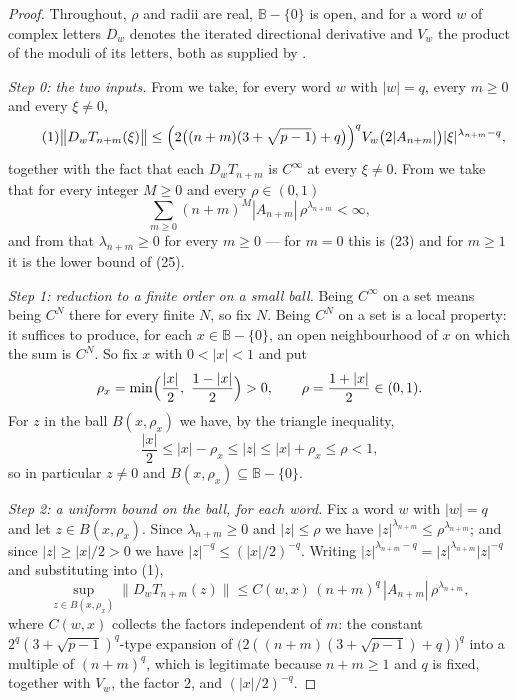 \begin{proof}
Throughout, $\rho$ and radii are real, $\mathbb{B}-\{0\}$ is open, and for a
word $w$ of complex letters $D_w$ denotes the iterated directional derivative
and $V_w$ the product of the moduli of its letters, both as supplied by
.

\emph{Step 0: the two inputs.}  From  we take,
for every word $w$ with $|w|=q$, every $m\ge0$ and every $\xi\ne0$,
\begin{equation}\tag{1}
  \bigl\|D_wT_{n+m}(\xi)\bigr\|
  \le\Bigl(2\bigl((n+m)(3+\sqrt{p-1})+q\bigr)\Bigr)^{q}V_w
     \bigl(2|A_{n+m}|\bigr)|\xi|^{\lambda_{n+m}-q},
\end{equation}
together with the fact that each $D_wT_{n+m}$ is $C^\infty$ at every $\xi\ne0$.
From  we take that for every integer
$M\ge0$ and every $\rho\in(0,1)$
\begin{equation}\tag{2}
  \sum_{m\ge0}(n+m)^{M}|A_{n+m}|\,\rho^{\lambda_{n+m}}<\infty ,
\end{equation}
and from  that $\lambda_{n+m}\ge0$ for every
$m\ge0$ --- for $m=0$ this is (23) and for $m\ge1$ it is the lower bound of
(25).

\emph{Step 1: reduction to a finite order on a small ball.}  Being $C^\infty$
on a set means being $C^N$ there for every finite $N$, so fix $N$.  Being
$C^N$ on a set is a local property: it suffices to produce, for each
$x\in\mathbb{B}-\{0\}$, an open neighbourhood of $x$ on which the sum is
$C^N$.  So fix $x$ with $0<|x|<1$ and put
\[
  \rho_x=\min\Bigl(\frac{|x|}{2},\ \frac{1-|x|}{2}\Bigr)>0 ,
  \qquad
  \rho=\frac{1+|x|}{2}\in(0,1).
\]
For $z$ in the ball $B(x,\rho_x)$ we have, by the triangle inequality,
\[
  \frac{|x|}{2}\le|x|-\rho_x\le|z|\le|x|+\rho_x\le\rho<1 ,
\]
so in particular $z\ne0$ and $B(x,\rho_x)\subseteq\mathbb{B}-\{0\}$.

\emph{Step 2: a uniform bound on the ball, for each word.}  Fix a word $w$
with $|w|=q$ and let $z\in B(x,\rho_x)$.  Since $\lambda_{n+m}\ge0$ and
$|z|\le\rho$ we have $|z|^{\lambda_{n+m}}\le\rho^{\lambda_{n+m}}$; and since
$|z|\ge|x|/2>0$ we have $|z|^{-q}\le(|x|/2)^{-q}$.  Writing
$|z|^{\lambda_{n+m}-q}=|z|^{\lambda_{n+m}}|z|^{-q}$ and substituting into (1),
\begin{equation}\tag{3}
  \sup_{z\in B(x,\rho_x)}\bigl\|D_wT_{n+m}(z)\bigr\|
  \le C(w,x)\,(n+m)^{q}\,|A_{n+m}|\,\rho^{\lambda_{n+m}} ,
\end{equation}
where $C(w,x)$ collects the factors independent of $m$: the constant
$2^{q}(3+\sqrt{p-1})^{q}$-type expansion of
$\bigl(2((n+m)(3+\sqrt{p-1})+q)\bigr)^{q}$ into a multiple of $(n+m)^{q}$,
which is legitimate because $n+m\ge1$ and $q$ is fixed, together with $V_w$,
the factor $2$, and $(|x|/2)^{-q}$.


\end{proof}
